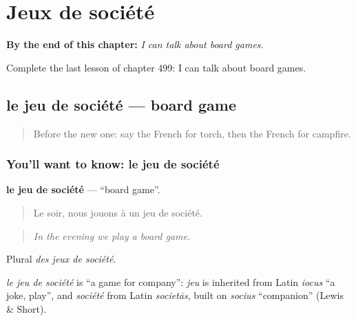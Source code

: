 
\chapter{Jeux de société}
\label{ch:fr-jeux-de-societe}

\begin{chapteropening}
\textbf{By the end of this chapter:} \emph{I can talk about board games.}

Complete the last lesson of chapter 499: I can talk about board games.
\end{chapteropening}

\section[le jeu de société]{le jeu de société — board game}

\label{lesson:FR-C499-jeu-de-societe}



\begin{quote}
Before the new one: say the French for torch, then the French for campfire.
\end{quote}

\subsection*{You'll want to know: le jeu de société}
\textbf{le jeu de société} — \textquotedblleft{}board game\textquotedblright{}.

\begin{quote}
Le soir, nous jouons à un jeu de société.
\end{quote}

\begin{quote}
\emph{In the evening we play a board game.}
\end{quote}

Plural \emph{des jeux de société}.

\begin{cousinweb}
\emph{le jeu de société} is \textquotedblleft{}a game for company\textquotedblright{}: \emph{jeu} is inherited from Latin \emph{iocus} \textquotedblleft{}a joke, play\textquotedblright{}, and \emph{société} from Latin \emph{societās}, built on \emph{socius} \textquotedblleft{}companion\textquotedblright{} (Lewis \& Short).
\end{cousinweb}

